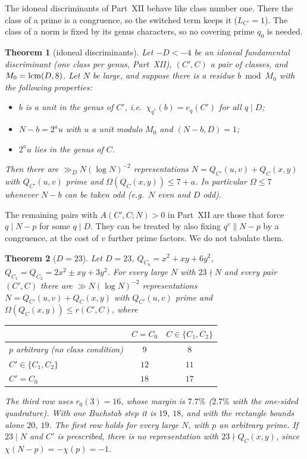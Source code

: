 \documentclass[11pt]{amsart}
\newtheorem{theorem}{Theorem}[section]
\theoremstyle{remark}
\begin{document}
The idoneal discriminants of Part~XII behave like class number one. There the class of a prime is a congruence, so the switched term keeps it ($L_{C'}=1$). The class of a norm is fixed by its genus characters, so no covering prime $q_0$ is needed.

\begin{theorem}[idoneal discriminants]\label{thm:idoneal}
Let $-D<-4$ be an idoneal fundamental discriminant (one class per genus, Part~XII), $(C',C)$ a pair of classes, and $M_0={\rm lcm}(D,8)$. Let $N$ be large, and suppose there is a residue $b\bmod M_0$ with the following properties:
\begin{itemize}[leftmargin=1.5em]
\item $b$ is a unit in the genus of $C'$, i.e.\ $\chi_{q^*}(b)=e_q(C')$ for all $q\mid D$;
\item $N-b=2^au$ with $u$ a unit modulo $M_0$ and $(N-b,D)=1$;
\item $2^au$ lies in the genus of $C$.
\end{itemize}
Then there are $\gg_DN(\log N)^{-2}$ representations $N=Q_{C'}(u,v)+Q_C(x,y)$ with $Q_{C'}(u,v)$ prime and $\Omega(Q_C(x,y))\le7+a$. In particular $\Omega\le7$ whenever $N-b$ can be taken odd (e.g.\ $N$ even and $D$ odd).
\end{theorem}
The remaining pairs with $A(C',C;N)>0$ in Part~XII are those that force $q\mid N-p$ for some $q\mid D$. They can be treated by also fixing $q^v\parallel N-p$ by a congruence, at the cost of $v$ further prime factors. We do not tabulate them.

\begin{theorem}[$D=23$]\label{thm:d23}
Let $D=23$, $Q_{C_0}=x^2+xy+6y^2$, $Q_{C_1}=Q_{C_2}=2x^2\pm xy+3y^2$. For every large $N$ with $23\nmid N$ and every pair $(C',C)$ there are $\gg N(\log N)^{-2}$ representations $N=Q_{C'}(u,v)+Q_C(x,y)$ with $Q_{C'}(u,v)$ prime and $\Omega(Q_C(x,y))\le r(C',C)$, where
\begin{center}
\begin{tabular}{lcc}
\toprule
 & $C=C_0$ & $C\in\{C_1,C_2\}$\\
\midrule
$p$ arbitrary (no class condition) & $9$ & $8$\\
$C'\in\{C_1,C_2\}$ & $12$ & $11$\\
$C'=C_0$ & $18$ & $17$\\
\bottomrule
\end{tabular}
\end{center}
The third row uses $r_0(3)=16$, whose margin is $7.7\%$ ($2.7\%$ with the one-sided quadrature). With one Buchstab step it is $19$, $18$, and with the rectangle bounds alone $20$, $19$. The first row holds for every large $N$, with $p$ an arbitrary prime. If $23\mid N$ and $C'$ is prescribed, there is no representation with $23\nmid Q_C(x,y)$, since $\chi(N-p)=-\chi(p)=-1$.
\end{theorem}
\end{document}
